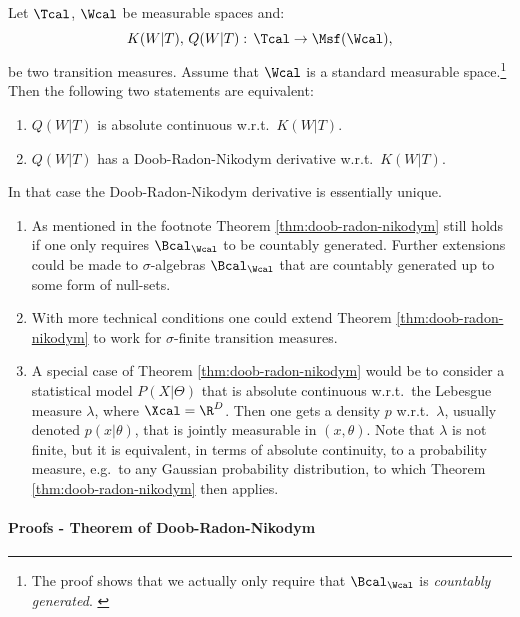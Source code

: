 \begin{Thm}
    \label{thm:doob-radon-nikodym}
    Let $\Tcal$, $\Wcal$ be measurable spaces and:
    \[ K(W|T), \,Q(W|T):\, \Tcal \to \Msf(\Wcal),  \]
    be two transition measures. Assume that $\Wcal$ is a standard measurable space.\footnote{The proof shows that we actually only require that $\Bcal_\Wcal$ is \emph{countably generated}. \label{fn:count-generated}} Then the following two statements are equivalent:
    \begin{enumerate}
        \item $Q(W|T)$ is absolute continuous w.r.t.\ $K(W|T)$.  
        \item $Q(W|T)$ has a Doob-Radon-Nikodym derivative w.r.t.\ $K(W|T)$.
    \end{enumerate}
    In that case the Doob-Radon-Nikodym derivative is essentially unique.
\end{Thm}

\begin{Rem}
    \begin{enumerate}
        \item As mentioned in the footnote Theorem \ref{thm:doob-radon-nikodym} still holds if one only requires $\Bcal_\Wcal$ to be countably generated. Further extensions could be made to $\sigma$-algebras $\Bcal_\Wcal$ that are countably generated up to some form of null-sets.
        \item With more technical conditions one could extend Theorem \ref{thm:doob-radon-nikodym} to work for $\sigma$-finite transition measures.
        \item A special case of Theorem \ref{thm:doob-radon-nikodym} would be to consider a statistical model $P(X|\Theta)$
            that is absolute continuous w.r.t.\ the Lebesgue measure $\lambda$, where $\Xcal=\R^D$.
            Then one gets a density $p$ w.r.t.\ $\lambda$, usually denoted $p(x|\theta)$, that is jointly measurable in $(x,\theta)$.
            Note that $\lambda$ is not finite, but it is equivalent, in terms of absolute continuity, to a probability measure, e.g.\ to any Gaussian probability distribution, to which Theorem \ref{thm:doob-radon-nikodym} then applies.
    \end{enumerate}
\end{Rem}



\paragraph{Proofs - Theorem of Doob-Radon-Nikodym}


